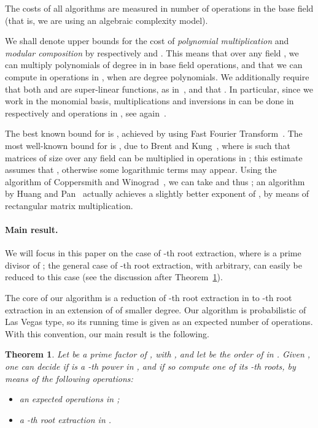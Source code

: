 \documentclass[12pt]{article}
\theoremstyle{plain}
\newtheorem{theorem}{Theorem}
\theoremstyle{definition}
\newcounter{algorithm}
\begin{document}
The costs of all algorithms are measured in number of operations
 in the base field  (that is, we are using an
algebraic complexity model).

We shall denote upper bounds for the cost of {\em polynomial
  multiplication} and {\em modular composition} by respectively
 and . This means that over any field , we can
multiply polynomials of degree  in  in  base field
operations, and that we can compute  in 
operations in , when  are degree  polynomials. We
additionally require that both  and  are super-linear
functions, as in~\cite[Chapter~8]{GaGe03}, and that .
In particular, since we work in the monomial basis, multiplications
and inversions in  can be done in respectively  and
 operations in , see again~\cite{GaGe03}.

The best known bound for  is , achieved
by using Fast Fourier Transform~\cite{Schonhage1971,CaKa91}.  The most
well-known bound for  is , due to Brent
and Kung~\cite{BrKu78}, where  is such that matrices of size
 over any field  can be multiplied in  operations
in ; this estimate assumes that , otherwise some
logarithmic terms may appear. Using the algorithm of Coppersmith and
Winograd~\cite{CoWi90}, we can take  and thus
; an algorithm by Huang and Pan~\cite{HuPa98}
actually achieves a slightly better exponent of , by means of
rectangular matrix multiplication.

\paragraph{Main result.}
We will focus in this paper on the case of -th root extraction,
where  is a prime divisor of ; the general case of -th root
extraction, with  arbitrary, can easily be reduced to this case
(see the discussion after Theorem~\ref{theo:main}).

The core of our algorithm is a reduction of -th root extraction in
 to -th root extraction in an extension of  of smaller
degree. Our algorithm is probabilistic of Las Vegas type, so 
its running time is given as an expected number of operations. With
this convention, our main result is the following.

\begin{theorem}\label{theo:main}
  Let  be a prime factor of , with , and let  be the
  order of  in . Given , one
  can decide if  is a -th power in , and if so compute
  one of its -th roots, by means of the following operations:
  \begin{itemize}
  \item an expected  operations in
    ;
  \item a -th root extraction in .
  \end{itemize}
\end{theorem}
\end{document}
